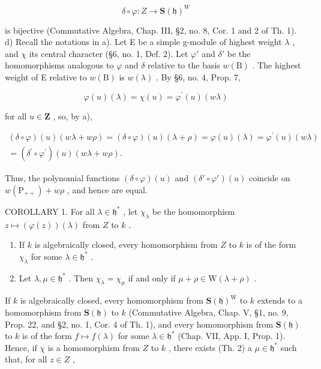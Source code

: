 \[
\delta \circ \varphi : Z \to \mathbf {S} (\mathfrak {h}) ^ {W}
\]

is bijective (Commutative Algebra, Chap. III, §2, no. 8, Cor. 1 and 2 of Th. 1). d) Recall the notations in a). Let E be a simple g-module of highest weight \(\lambda\) , and \(\chi\) its central character (§6, no. 1, Def. 2). Let \(\varphi'\) and \(\delta'\) be the homomorphisms analogous to \(\varphi\) and \(\delta\) relative to the basis \(w(\mathrm{B})\) . The highest weight of E relative to \(w(\mathrm{B})\) is \(w(\lambda)\) . By §6, no. 4, Prop. 7,

\[
\varphi (u) (\lambda) = \chi (u) = \varphi^ {\prime} (u) (w \lambda)
\]

for all \(u\in \mathbf{Z}\) , so, by a),

\[
\begin{array}{c} (\delta \circ \varphi) (u) (w \lambda + w \rho) = (\delta \circ \varphi) (u) (\lambda + \rho) = \varphi (u) (\lambda) = \varphi^ {\prime} (u) (w \lambda) \\ = (\delta^ {\prime} \circ \varphi^ {\prime}) (u) (w \lambda + w \rho). \end{array}
\]

Thus, the polynomial functions \((\delta \circ \varphi)(u)\) and \((\delta' \circ \varphi')(u)\) coincide on \(w(\mathrm{P}_{++}) + w\rho\) , and hence are equal.

COROLLARY 1. For all \(\lambda \in \mathfrak{h}^*\) , let \(\chi_{\lambda}\) be the homomorphism \(z \mapsto (\varphi(z))(\lambda)\) from \(Z\) to \(k\) .

\begin{enumerate}
\def\labelenumi{(\roman{enumi})}
\item
  If \(k\) is algebraically closed, every homomorphism from \(Z\) to \(k\) is of the form \(\chi_{\lambda}\) for some \(\lambda \in \mathfrak{h}^*\) .
\item
  Let \(\lambda, \mu \in \mathfrak{h}^*\) . Then \(\chi_{\lambda} = \chi_{\mu}\) if and only if \(\mu + \rho \in \mathrm{W}(\lambda + \rho)\) .
\end{enumerate}

If \(k\) is algebraically closed, every homomorphism from \(\mathbf{S}(\mathfrak{h})^{\mathrm{W}}\) to \(k\) extends to a homomorphism from \(\mathbf{S}(\mathfrak{h})\) to \(k\) (Commutative Algebra, Chap. V, §1, no. 9, Prop. 22, and §2, no. 1, Cor. 4 of Th. 1), and every homomorphism from \(\mathbf{S}(\mathfrak{h})\) to \(k\) is of the form \(f \mapsto f(\lambda)\) for some \(\lambda \in \mathfrak{h}^*\) (Chap. VII, App. I, Prop. 1). Hence, if \(\chi\) is a homomorphism from \(Z\) to \(k\) , there exists (Th. 2) a \(\mu \in \mathfrak{h}^*\) such that, for all \(z \in Z\) ,


